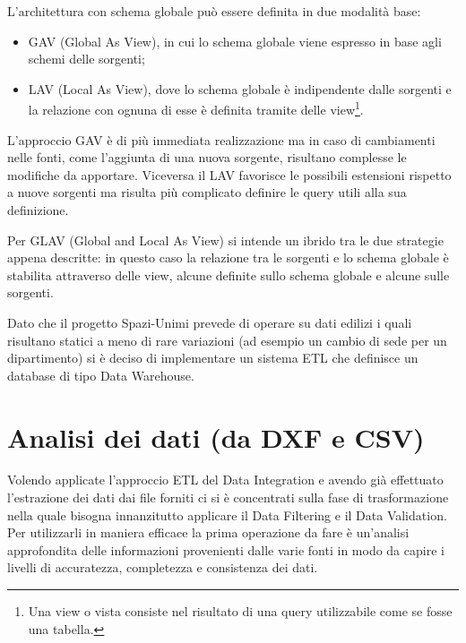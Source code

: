 \documentclass[12pt]{report}
\begin{document}
\vspace{5mm} %

L'architettura con schema globale può essere definita in due modalità base:
\begin{itemize}
\item GAV (Global As View), in cui lo schema globale viene espresso in base agli schemi delle sorgenti;
\item LAV (Local As View), dove lo schema globale è indipendente dalle sorgenti e la relazione con ognuna di esse è definita tramite delle view\footnote{Una view o vista consiste nel risultato di una query utilizzabile come se fosse una tabella.}. 
\end{itemize}

L'approccio GAV è di più immediata realizzazione ma in caso di cambiamenti nelle fonti, come l'aggiunta di una nuova sorgente, risultano complesse le modifiche da apportare.
Viceversa il LAV favorisce le possibili estensioni rispetto a nuove sorgenti ma risulta più complicato definire le query utili alla sua definizione.     

Per GLAV (Global and Local As View) si intende un ibrido tra le due strategie appena descritte: in questo caso la relazione tra le sorgenti e lo schema globale è stabilita attraverso delle view, alcune definite sullo schema globale e alcune sulle sorgenti.

\vspace{5mm} %

Dato che il progetto Spazi-Unimi prevede di operare su dati edilizi i quali risultano statici a meno di rare variazioni (ad esempio un cambio di sede per un dipartimento) si è deciso di implementare un sistema ETL che definisce un database di tipo Data Warehouse.


\newpage
\section{Analisi dei dati (da DXF e CSV)}

Volendo applicate l'approccio ETL del Data Integration e avendo già effettuato l'estrazione dei dati dai file forniti ci si è concentrati sulla fase di trasformazione nella quale bisogna innanzitutto applicare il Data Filtering e il Data Validation.
Per utilizzarli in maniera efficace la prima operazione da fare è un'analisi approfondita delle informazioni provenienti dalle varie fonti in modo da capire i livelli di accuratezza, completezza e consistenza dei dati.
\end{document}
